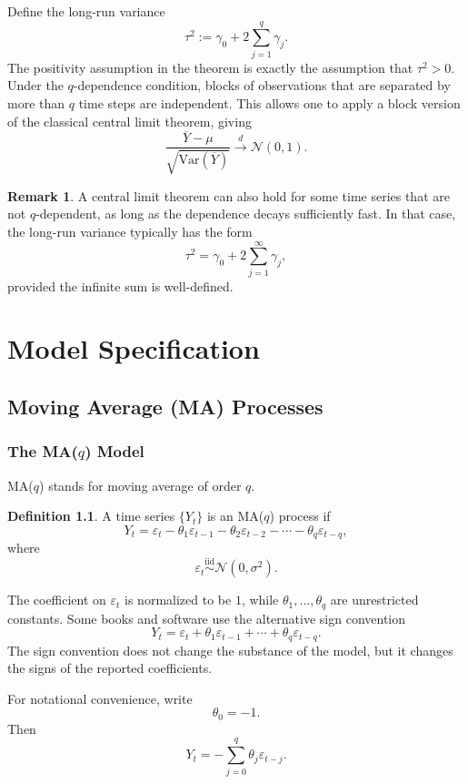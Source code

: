 \documentclass[12pt,oneside]{book}
\numberwithin{equation}{section}
\theoremstyle{definition}
\newtheorem{definition}{Definition}[section]
\newtheorem{remark}{Remark}[section]
\theoremstyle{plain}
\theoremstyle{remark}
\newcommand{\Var}{\mathrm{Var}}
\newcommand{\iid}{\overset{\text{iid}}{\sim}}
\newcommand{\convd}{\overset{d}{\to}}
\newcommand{\Normal}{\mathcal{N}}
\begin{document}
Define the long-run variance
\[
\tau^2
:=
\gamma_0+2\sum_{j=1}^{q}\gamma_j.
\]
The positivity assumption in the theorem is exactly the assumption that $\tau^2>0$. Under the $q$-dependence condition, blocks of observations that are separated by more than $q$ time steps are independent. This allows one to apply a block version of the classical central limit theorem, giving
\[
\frac{\overline{Y}-\mu}{\sqrt{\Var(\overline{Y})}}
\convd
\Normal(0,1).
\]

\begin{remark}
A central limit theorem can also hold for some time series that are not $q$-dependent, as long as the dependence decays sufficiently fast. In that case, the long-run variance typically has the form
\[
\tau^2
=
\gamma_0+2\sum_{j=1}^{\infty}\gamma_j,
\]
provided the infinite sum is well-defined.
\end{remark}

\chapter{Model Specification}

\section{Moving Average (MA) Processes}

\subsection*{The MA($q$) Model}

MA($q$) stands for moving average of order $q$.

\begin{definition}
A time series $\{Y_t\}$ is an MA($q$) process if
\[
Y_t
=
\varepsilon_t-\theta_1\varepsilon_{t-1}
-\theta_2\varepsilon_{t-2}
-\cdots
-\theta_q\varepsilon_{t-q},
\]
where
\[
\varepsilon_t \iid \Normal(0,\sigma^2).
\]
\end{definition}

The coefficient on $\varepsilon_t$ is normalized to be $1$, while $\theta_1,\ldots,\theta_q$ are unrestricted constants. Some books and software use the alternative sign convention
\[
Y_t
=
\varepsilon_t+\theta_1\varepsilon_{t-1}
+\cdots
+\theta_q\varepsilon_{t-q}.
\]
The sign convention does not change the substance of the model, but it changes the signs of the reported coefficients.

For notational convenience, write
\[
\theta_0=-1.
\]
Then
\[
Y_t
=
-\sum_{j=0}^{q}\theta_j\varepsilon_{t-j}.
\]
\end{document}
